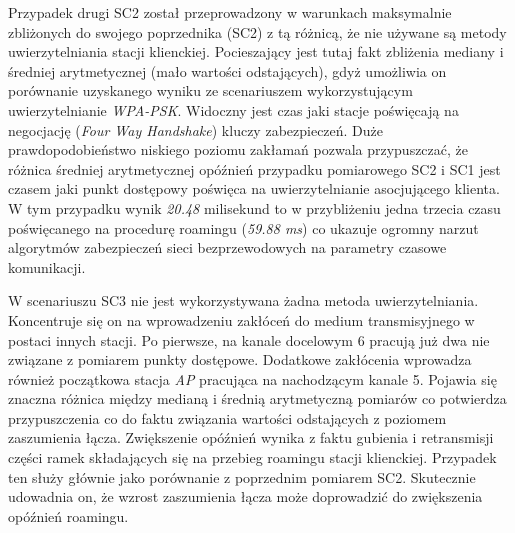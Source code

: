 Przypadek drugi SC2 został przeprowadzony w warunkach maksymalnie zbliżonych do swojego poprzednika (SC2) z tą różnicą, że nie używane są metody uwierzytelniania stacji klienckiej. Pocieszający jest tutaj fakt zbliżenia mediany i średniej arytmetycznej (mało wartości odstających), gdyż umożliwia on porównanie uzyskanego wyniku ze scenariuszem wykorzystującym uwierzytelnianie \emph{WPA-PSK}. Widoczny jest czas jaki stacje poświęcają na negocjację (\emph{Four Way Handshake}) kluczy zabezpieczeń. Duże prawdopodobieństwo niskiego poziomu zakłamań pozwala przypuszczać, że różnica średniej arytmetycznej opóźnień przypadku pomiarowego SC2 i SC1 jest czasem jaki punkt dostępowy poświęca na uwierzytelnianie asocjującego klienta. W tym przypadku wynik \emph{20.48} milisekund to w przybliżeniu jedna trzecia czasu poświęcanego na procedurę roamingu (\emph{59.88 ms}) co ukazuje ogromny narzut algorytmów zabezpieczeń sieci bezprzewodowych na parametry czasowe komunikacji.

W scenariuszu SC3 nie jest wykorzystywana żadna metoda uwierzytelniania. Koncentruje się on na wprowadzeniu zakłóceń do medium transmisyjnego w postaci innych stacji. Po pierwsze, na kanale docelowym 6 pracują już dwa nie związane z pomiarem punkty dostępowe. Dodatkowe zakłócenia wprowadza również początkowa stacja \emph{AP} pracująca na nachodzącym kanale 5. Pojawia się znaczna różnica między medianą i średnią arytmetyczną pomiarów co potwierdza przypuszczenia co do faktu związania wartości odstających z poziomem zaszumienia łącza. Zwiększenie opóźnień wynika z faktu gubienia i retransmisji części ramek składających się na przebieg roamingu stacji klienckiej. Przypadek ten służy głównie jako porównanie z poprzednim pomiarem SC2. Skutecznie udowadnia on, że wzrost zaszumienia łącza może doprowadzić do zwiększenia opóźnień roamingu.

